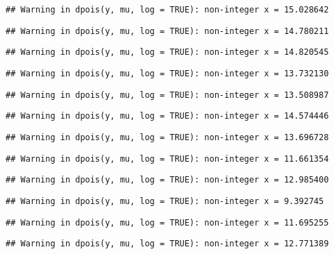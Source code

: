 \documentclass[
]{article}
\begin{document}
\begin{verbatim}
## Warning in dpois(y, mu, log = TRUE): non-integer x = 15.028642
\end{verbatim}

\begin{verbatim}
## Warning in dpois(y, mu, log = TRUE): non-integer x = 14.780211
\end{verbatim}

\begin{verbatim}
## Warning in dpois(y, mu, log = TRUE): non-integer x = 14.820545
\end{verbatim}

\begin{verbatim}
## Warning in dpois(y, mu, log = TRUE): non-integer x = 13.732130
\end{verbatim}

\begin{verbatim}
## Warning in dpois(y, mu, log = TRUE): non-integer x = 13.508987
\end{verbatim}

\begin{verbatim}
## Warning in dpois(y, mu, log = TRUE): non-integer x = 14.574446
\end{verbatim}

\begin{verbatim}
## Warning in dpois(y, mu, log = TRUE): non-integer x = 13.696728
\end{verbatim}

\begin{verbatim}
## Warning in dpois(y, mu, log = TRUE): non-integer x = 11.661354
\end{verbatim}

\begin{verbatim}
## Warning in dpois(y, mu, log = TRUE): non-integer x = 12.985400
\end{verbatim}

\begin{verbatim}
## Warning in dpois(y, mu, log = TRUE): non-integer x = 9.392745
\end{verbatim}

\begin{verbatim}
## Warning in dpois(y, mu, log = TRUE): non-integer x = 11.695255
\end{verbatim}

\begin{verbatim}
## Warning in dpois(y, mu, log = TRUE): non-integer x = 12.771389
\end{verbatim}
\end{document}
